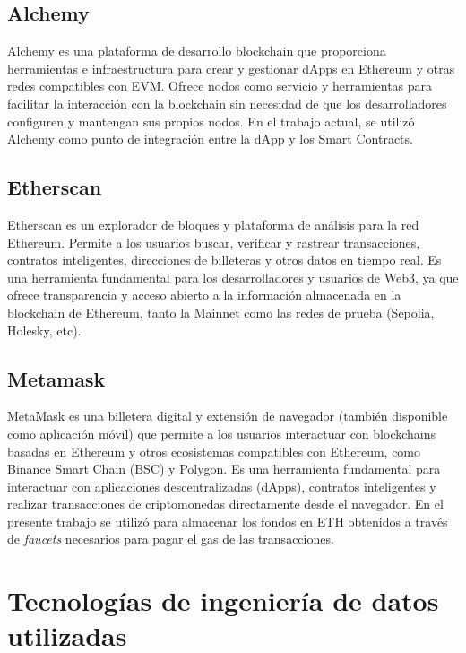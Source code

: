 \subsection{Alchemy}

Alchemy \cite{alchemy_website} es una plataforma de desarrollo blockchain que proporciona herramientas e infraestructura para crear y gestionar dApps en Ethereum y otras redes compatibles con EVM. Ofrece nodos como servicio y herramientas para facilitar la interacción con la blockchain sin necesidad de que los desarrolladores configuren y mantengan sus propios nodos. En el trabajo actual, se utilizó Alchemy como punto de integración entre la dApp y los Smart Contracts.

\subsection{Etherscan}

Etherscan \cite{etherscan} es un explorador de bloques y plataforma de análisis para la red Ethereum. Permite a los usuarios buscar, verificar y rastrear transacciones, contratos inteligentes, direcciones de billeteras y otros datos en tiempo real. Es una herramienta fundamental para los desarrolladores y usuarios de Web3, ya que ofrece transparencia y acceso abierto a la información almacenada en la blockchain de Ethereum, tanto la Mainnet como las redes de prueba (Sepolia, Holesky, etc).

\subsection{Metamask}

MetaMask \cite{metamask} es una billetera digital y extensión de navegador (también disponible como aplicación móvil) que permite a los usuarios interactuar con blockchains basadas en Ethereum y otros ecosistemas compatibles con Ethereum, como Binance Smart Chain (BSC) y Polygon. Es una herramienta fundamental para interactuar con aplicaciones descentralizadas (dApps), contratos inteligentes y realizar transacciones de criptomonedas directamente desde el navegador.
En el presente trabajo se utilizó para almacenar los fondos en ETH obtenidos a través de \textit{faucets} necesarios para pagar el gas de las transacciones.




\section{Tecnologías de ingeniería de datos utilizadas}



